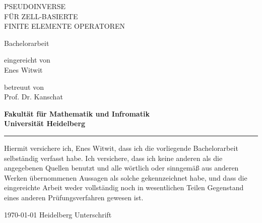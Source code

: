 \documentclass[12pt,a4paper]{scrartcl}
\numberwithin{equation}{section}
\begin{document}
\pagestyle{empty}
\setcounter{tocdepth}{2}




\begin{titlepage}

\vspace*{1cm} 
\begin{center} 


{\huge{ PSEUDOINVERSE \\ FÜR ZELL-BASIERTE \\ FINITE ELEMENTE OPERATOREN}}
\vspace*{2cm}

{\Large Bachelorarbeit}
\vspace*{1cm}


eingereicht von \\[0.5cm]

{\Large Enes Witwit}
\vspace*{1cm}

betreuut von  \\[0.5cm]
{\Large Prof. Dr. Kanschat}
\vspace*{5cm}

\textbf{
Fakultät für Mathematik und Infromatik\\[0.3cm]
Universität Heidelberg}
\end{center}
\end{titlepage}



\newpage
\thispagestyle{empty}
\vspace*{14cm}

\noindent\rule{16cm}{0.4pt}

Hiermit versichere ich, Enes Witwit, dass ich die vorliegende Bachelorarbeit selbständig
verfasst habe.
Ich versichere, dass ich keine anderen als die angegebenen Quellen benutzt und
alle wörtlich oder sinngemäß aus anderen Werken übernommenen Aussagen als
solche gekennzeichnet habe, und dass die eingereichte Arbeit weder vollständig
noch in wesentlichen Teilen Gegenstand eines anderen Prüfungsverfahren
gewesen ist. \\[2ex] 

\noindent


\today \hspace*{1cm}  Heidelberg \hspace*{5cm} Unterschrift\\[5ex]

\end{document}
